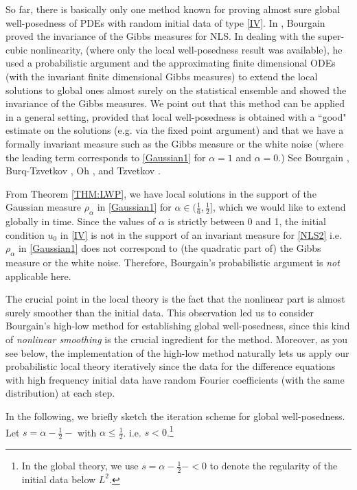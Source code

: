 \documentclass[11pt]{amsart}
\numberwithin{equation}{section} \numberwithin{theorem}{section}
\begin{document}
So far, there is basically only one method known for proving  almost sure global well-posedness of PDEs 
with random initial data of type \eqref{IV}. 
In \cite{Bourgain:1994p435}, Bourgain proved the invariance of the Gibbs measures for NLS. In dealing with the super-cubic nonlinearity, (where only the local well-posedness result was available), he used a probabilistic argument and the approximating finite dimensional ODEs (with the invariant finite dimensional Gibbs measures) to extend the local solutions to global ones almost surely on the statistical ensemble and showed the invariance of the Gibbs measures. We point out that this method can be applied in a general setting, provided that  local well-posedness is obtained with a ``good" estimate on the solutions (e.g. via the fixed point argument) and that we have a formally invariant measure such as the Gibbs measure or the white noise (where the leading term corresponds to \eqref{Gaussian1} for ${\alpha} = 1$ and ${\alpha} = 0$.) See Bourgain \cite{Bourgain:1994p540, Bourgain:1996p446}, Burq-Tzvetkov \cite{Burq:2007p1542,Burq:2008p623}, Oh \cite{Oh:2009p791, OhSBO, Oh:2009p1296}, and Tzvetkov \cite{Tzvetkov:2006p801,Tzvetkov:2008p736}.

From Theorem \ref{THM:LWP}, we have local solutions in the support of the Gaussian measure $\rho_{\alpha}$ in \eqref{Gaussian1} for ${\alpha} \in (\frac{1}{6}, \frac{1}{2}]$, which we would like to extend globally in time. 
Since the values of ${\alpha}$ is strictly between 0 and 1, the initial condition $u_0$ in \eqref{IV} is not in the support of an invariant measure for \eqref{NLS2} i.e. 
$\rho_{\alpha}$ in \eqref{Gaussian1} does not correspond to (the quadratic part of) the Gibbs measure or the white noise.
 Therefore, Bourgain's probabilistic argument \cite{Bourgain:1994p435} is {\it not} applicable here.

The crucial point in the local theory is the fact 
that the nonlinear part is almost surely smoother than the initial data.
This observation led us to consider Bourgain's high-low method \cite{Bourgain:1998p434}
for establishing global well-posedness, 
 since this kind of {\it nonlinear smoothing} is the crucial ingredient for the method. Moreover, as you see below, the implementation of the high-low method naturally lets us apply our probabilistic local theory iteratively since the data for the difference equations with high frequency initial data 
 have random Fourier coefficients (with the same distribution) at each step.

\medskip
In the following, we briefly sketch the iteration scheme for global well-posedness.
Let $s = {\alpha} - \frac{1}{2}-$ with ${\alpha} \leq \frac{1}{2}$. i.e. $s<0$.\footnote{In the global theory, 
we use $s = {\alpha} - \frac{1}{2}- < 0$ to denote
the regularity of the initial data below $L^2$.}
\end{document}
